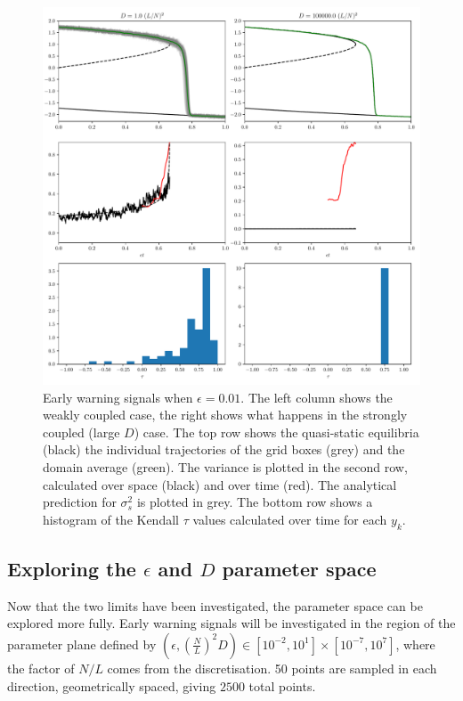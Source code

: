 \begin{figure}
  \centering
  \includegraphics[width=\textwidth,keepaspectratio]{coupled_variance}
  \caption[Early Warning Signals in the slowly forced limit]{Early warning signals when $\epsilon = 0.01$. The left column shows 
    the weakly coupled case, the right shows what happens in the strongly coupled (large $D$) case. 
    The top row shows the quasi-static equilibria (black) the individual
    trajectories of the grid boxes (grey) and the domain average (green).
    The variance is plotted in the second row, calculated over space 
    (black) and over time (red). The analytical prediction for $\sigma_s^2$ is plotted in grey.
    The bottom row shows a histogram of the Kendall $\tau$ values calculated over time for each $y_k$.}
  \label{fig:coupled_timeseries}
\end{figure}

\subsection{Exploring the $\epsilon$ and $D$ parameter space}
Now that the two limits have been investigated, the parameter space can be explored more fully.
Early warning signals will be investigated in the region of the parameter plane defined by $(\epsilon,\left(\frac{N}{L}\right)^2 D) \in [10^{-2},10^1] \times [10^{-7}, 10^{7}]$,
where the factor of $N/L$ comes from the discretisation.
50 points are sampled in each direction, geometrically spaced, giving $2500$ total points.

